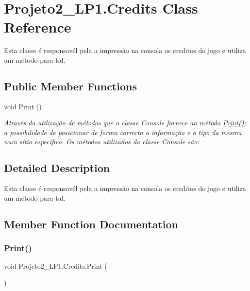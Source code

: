 \hypertarget{class_projeto2___l_p1_1_1_credits}{}\section{Projeto2\+\_\+\+L\+P1.\+Credits Class Reference}
\label{class_projeto2___l_p1_1_1_credits}


Esta classe é responsavél pela a impressão na consola os creditos do jogo e utiliza um método para tal.  


\subsection*{Public Member Functions}
\begin{DoxyCompactItemize}
\item 
void \mbox{\hyperlink{class_projeto2___l_p1_1_1_credits_a34a88547053660a821523f26d0d47230}{Print}} ()
\begin{DoxyCompactList}\small\item\em Através da utilização de métodos que a classe Console fornece ao método \mbox{\hyperlink{class_projeto2___l_p1_1_1_credits_a34a88547053660a821523f26d0d47230}{Print()}}; a possibilidade de posicionar de forma correcta a informação e o tipo da mesma num sítio específico. Os métodos utilizados da classe Console são\+: \end{DoxyCompactList}\end{DoxyCompactItemize}


\subsection{Detailed Description}
Esta classe é responsavél pela a impressão na consola os creditos do jogo e utiliza um método para tal. 



\subsection{Member Function Documentation}
\mbox{\label{class_projeto2___l_p1_1_1_credits_a34a88547053660a821523f26d0d47230}} 
\subsubsection{\texorpdfstring{Print()}{Print()}}
{\footnotesize\ttfamily void Projeto2\+\_\+\+L\+P1.\+Credits.\+Print (\begin{DoxyParamCaption}{ }\end{DoxyParamCaption})\hspace{0.3cm}{\ttfamily [inline]}}



